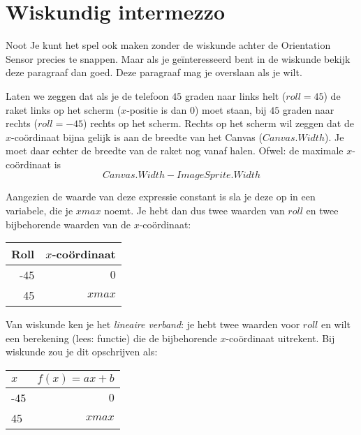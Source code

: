 \section{Wiskundig intermezzo}
\begin{derivation}{Noot}
Je kunt het spel ook maken zonder de wiskunde achter de Orientation Sensor precies te snappen. Maar als je ge\"interesseerd bent in de wiskunde bekijk deze paragraaf dan goed. Deze paragraaf mag je overslaan als je wilt.
\end{derivation}

Laten we zeggen dat als je de telefoon $45$ graden naar links helt ($roll=45$) de raket links op het scherm ($x$-positie is dan $0$) moet staan, bij $45$ graden naar rechts ($roll= -45$) rechts op het scherm. Rechts op het scherm wil zeggen dat de $x$-co\"ordinaat bijna gelijk is aan de breedte van het Canvas ($Canvas.Width$). Je moet daar echter de breedte van de raket nog vanaf halen. Ofwel: de maximale $x$-co\"ordinaat is 
\[
     Canvas.Width - ImageSprite.Width
\]

Aangezien de waarde van deze expressie constant is sla je deze op in een variabele, die je $xmax$ noemt. Je hebt dan dus twee waarden van $roll$ en twee bijbehorende waarden van de $x$-co\"ordinaat:
\begin{center}
  \begin{tabular}{ r | r }
    \hline
	Roll	&	$x$-co\"ordinaat  \\
	\hline 
	-45	&	$0$             \\
	45	&	$xmax$          \\
    \hline
  \end{tabular}
\end{center}

Van wiskunde ken je het \emph{lineaire verband}: je hebt twee waarden voor $roll$ en wilt een berekening (lees: functie) die de bijbehorende $x$-co\"ordinaat uitrekent. Bij wiskunde zou je dit opschrijven als: 

\begin{center}
  \begin{tabular}{ l | r }
    \hline
	$x$	&	 $ f(x) = ax + b $  \\
	\hline
	-45	&	$0$               \\

	45	& 	$xmax$            \\
    \hline
  \end{tabular}
\end{center}

